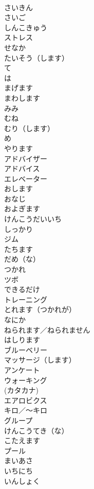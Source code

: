 \documentclass[8pt]{extreport}
\begin{document}
\begin{CJK}{UTF8}{min}
\\	さいきん	
\\	さいご	
\\	しんこきゅう	
\\	ストレス	
\\	せなか	
\\	たいそう（します）	
\\	て	
\\	は	
\\	まげます	
\\	まわします	
\\	みみ	
\\	むね	
\\	むり（します）	
\\	め	
\\	やります	
\\	アドバイザー	
\\	アドバイス	
\\	エレベーター	
\\	おします	
\\	おなじ	
\\	およぎます	
\\	けんこうだいいち	
\\	しっかり	
\\	ジム	
\\	たちます	
\\	だめ（な）	
\\	つかれ	
\\	ツボ	
\\	できるだけ	
\\	トレーニング	
\\	とれます（つかれが）	
\\	なにか	
\\	ねられます／ねられません	
\\	はしります	
\\	ブルーベリー	
\\	マッサージ（します）	
\\	アンケート	
\\	ウォーキング	
\\	(カタカナ)
\\	エアロビクス	
\\	キロ／～キロ	
\\	グループ	
\\	けんこうてき（な）	
\\	こたえます	
\\	プール	
\\	まいあさ	
\\	いちにち	
\\	いんしょく	

\end{CJK}
\end{document}
